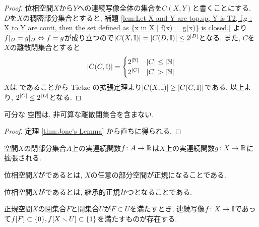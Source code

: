 \documentclass[uplatex, dvipdfmx, a4paper, 12pt, class=jsbook, crop=false]{standalone}
\begin{document}
\begin{proof}
	位相空間$ X $から$ Y $への連続写像全体の集合を$ C(X, Y) $と書くことにする. $ D $を$ X $の稠密部分集合とすると, 補題 \ref{lem:Let X and Y are top.sp, Y is T2, f,g : X to Y are conti, then the set defined as {x in X | f(x) = g(x)} is closed.} より$ f|_D = g|_D  \Leftrightarrow f =g $が成り立つので$ \left|C(X, \mathbb{I})\right| = \left|C(D, \mathbb{I})\right| \leq 2^{\left|D\right|} $となる. また, $ C $を$ X $の離散閉集合とすると
	$$ \left|C(C, \mathbb{I})\right| =\begin{cases}
	2^{\left|\mathbb{N}\right|} & \left|C\right| \leq \left|\mathbb{N}\right|\\
	2^{\left|C\right|} & \left|C\right| > \left|\mathbb{N}\right|
	\end{cases} $$
	$ X $は  であることから Tietze の拡張定理より$ \left|C(X, \mathbb{I})\right| \geq \left|C(C, \mathbb{I})\right| $である. 以上より, $ 2^{\left|C\right|} \leq 2^{\left|D\right|} $となる.
\end{proof}

\begin{corollary}
	\label{coro:Corollary of Jone's Lamma}
	可分な  空間は, 非可算な離散閉集合を含まない.
\end{corollary}

\begin{proof}
	定理 \ref{thm:Jone's Lemma} から直ちに得られる.
\end{proof}

\begin{theorem}[\Tietze]
	\label{thm:Tietze's extension theorem}
	 空間$ X $の閉部分集合$ A $上の実連続関数$ f \colon A \to \mathbb{R} $は$ X $上の実連続関数$ g \colon X \to \mathbb{R} $に拡張される.
\end{theorem}

\begin{definition}
	位相空間$ X $がであるとは, $ X $の任意の部分空間が正規になることである.
\end{definition}

\begin{definition}
	位相空間$ X $がであるとは, 継承的正規かつとなることである.
\end{definition}

\begin{theorem}
	\label{T400003}
	正規空間\( X \)の閉集合\( F \)と開集合\( U \)が\( F \subset U \)を満たすとき,
	連続写像\( f\colon X\to\mathbb{I} \)であって\( \mapset{f}{F} \subset \lrbrace{0},
	\mapset{f}{X \setminus U} \subset \lrbrace{1} \)を満たすものが存在する.
\end{theorem}
\end{document}
